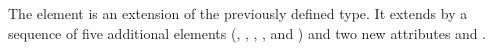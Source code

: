 The  element is an extension of the previously defined  type. It extends  by a sequence of five additional elements (, , , , and ) and two new attributes  and .
